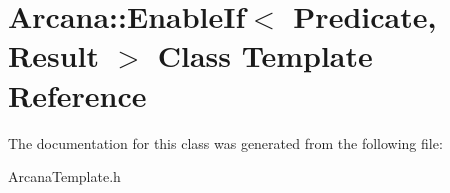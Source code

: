 \hypertarget{class_arcana_1_1_enable_if}{}\section{Arcana\+:\+:Enable\+If$<$ Predicate, Result $>$ Class Template Reference}
\label{class_arcana_1_1_enable_if}


The documentation for this class was generated from the following file\+:\begin{DoxyCompactItemize}
\item 
Arcana\+Template.\+h\end{DoxyCompactItemize}
